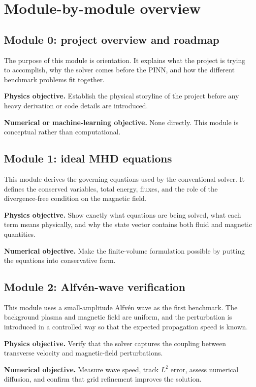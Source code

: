 \documentclass[11pt]{article}
\begin{document}
\section{Module-by-module overview}

\subsection{Module 0: project overview and roadmap}
The purpose of this module is orientation. It explains what the project is trying to accomplish, why the solver comes before the PINN, and how the different benchmark problems fit together.

\textbf{Physics objective.} Establish the physical storyline of the project before any heavy derivation or code details are introduced.

\textbf{Numerical or machine-learning objective.} None directly. This module is conceptual rather than computational.

\subsection{Module 1: ideal MHD equations}
This module derives the governing equations used by the conventional solver. It defines the conserved variables, total energy, fluxes, and the role of the divergence-free condition on the magnetic field.

\textbf{Physics objective.} Show exactly what equations are being solved, what each term means physically, and why the state vector contains both fluid and magnetic quantities.

\textbf{Numerical objective.} Make the finite-volume formulation possible by putting the equations into conservative form.

\subsection{Module 2: Alfv\'en-wave verification}
This module uses a small-amplitude Alfv\'en wave as the first benchmark. The background plasma and magnetic field are uniform, and the perturbation is introduced in a controlled way so that the expected propagation speed is known.

\textbf{Physics objective.} Verify that the solver captures the coupling between transverse velocity and magnetic-field perturbations.

\textbf{Numerical objective.} Measure wave speed, track $L^2$ error, assess numerical diffusion, and confirm that grid refinement improves the solution.
\end{document}
